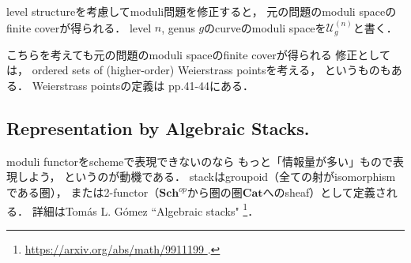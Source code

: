 \documentclass[a4paper]{jsarticle}
\newcommand{\Sch}{\mathbf{Sch}}
\newcommand{\Cat}{\mathbf{Cat}}
\newcommand{\spM}{\mathcal{U}}
\begin{document}
    level structureを考慮してmoduli問題を修正すると，
    元の問題のmoduli spaceのfinite coverが得られる．
    level $n$, genus $g$のcurveのmoduli spaceを$\spM_g^{(n)}$と書く．

    こちらを考えても元の問題のmoduli spaceのfinite coverが得られる
    修正としては，
    ordered sets of (higher-order) Weierstrass pointsを考える，
    というものもある．
    Weierstrass pointsの定義は\cite{GAC} pp.41-44にある．

    \subsection{Representation by Algebraic Stacks.}
    moduli functorをschemeで表現できないのなら
    もっと「情報量が多い」もので表現しよう，
    というのが動機である．
    stackはgroupoid（全ての射がisomorphismである圏），
    または2-functor（$\Sch^{op}$から圏の圏$\Cat$へのsheaf）として定義される．
    詳細はTom\'as L. G\'omez ``Algebraic stacks"
    \footnote{ \url{ https://arxiv.org/abs/math/9911199 }. }．



\end{document}
